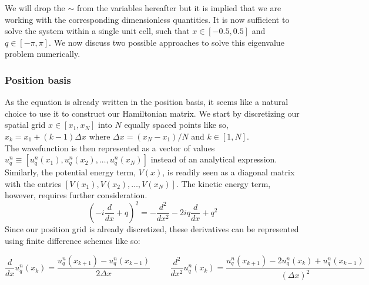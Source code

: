 We will drop the $\sim$ from the variables hereafter but it is implied that we are working with the corresponding dimensionless quantities. It is now sufficient to solve the system within a single unit cell, such that $x \in [-0.5, 0.5]$ and $q \in [-\pi, \pi]$. We now discuss two possible approaches to solve this eigenvalue problem numerically.  

\subsubsection{\large Position basis}
As the equation is already written in the position basis, it seems like a natural choice to use it to construct our Hamiltonian matrix. We start by discretizing our spatial grid $x \in [x_1, x_N]$ into $N$ equally spaced points like so, $x_k = x_1 + (k-1)\Delta x$ where $\Delta x = (x_N - x_1)/N$ and $k \in [1, N]$. 
\vspace{0.5cm}\\
The wavefunction is then represented as a vector of values $u_q^n \equiv [u_q^n(x_1), u_q^n(x_2), \dots, u_q^n(x_N)]$ instead of an analytical expression. Similarly, the potential energy term, $V(x)$, is readily seen as a diagonal matrix with the entries $[V(x_1), V(x_2), \dots, V(x_N)]$. The kinetic energy term, however, requires further consideration. 
$$\left (-i\frac{d}{d x} + q \right )^2 = -\frac{d ^2}{d x^2} - 2iq\frac{d }{d x} + q^2$$
Since our position grid is already discretized, these derivatives can be represented using finite difference schemes like so:

$$\frac{d}{dx}u_q^n(x_k) = \frac{u_q^n(x_{k+1}) - u_q^n(x_{k-1})}{2\Delta x} \hspace{1cm} \frac{d^2}{dx^2}u_q^n(x_k) = \frac{u_q^n(x_{k+1}) - 2u_q^n(x_k) + u_q^n(x_{k-1})}{(\Delta x)^2}$$

